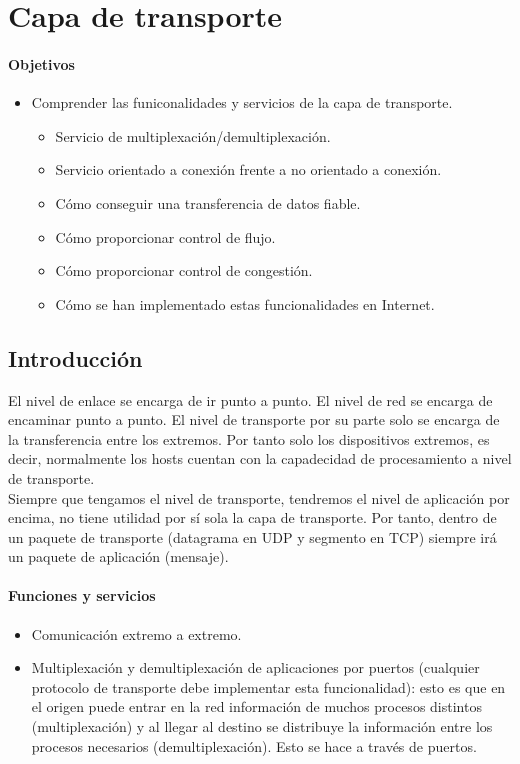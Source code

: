 \chapter{Capa de transporte}

\subsubsection{Objetivos}
\begin{itemize}
    \item Comprender las funiconalidades y servicios de la capa de transporte.
        \begin{itemize}
            \item Servicio de multiplexación/demultiplexación.
            \item Servicio orientado a conexión frente a no orientado a conexión.
            \item Cómo conseguir una transferencia de datos fiable.
            \item Cómo proporcionar control de flujo.
            \item Cómo proporcionar control de congestión.
            \item Cómo se han implementado estas funcionalidades en Internet.
        \end{itemize}
\end{itemize}

\section{Introducción}
El nivel de enlace se encarga de ir punto a punto. El nivel de red se encarga de encaminar punto a punto. El nivel de transporte por su parte solo se encarga de la transferencia entre los extremos. Por tanto solo los dispositivos extremos, es decir, normalmente los hosts cuentan con la capadecidad de procesamiento a nivel de transporte. \\

Siempre que tengamos el nivel de transporte, tendremos el nivel de aplicación por encima, no tiene utilidad por sí sola la capa de transporte. Por tanto, dentro de un paquete de transporte (datagrama en UDP y segmento en TCP) siempre irá un paquete de aplicación (mensaje).\\

\subsubsection{Funciones y servicios}
\begin{itemize}
    \item Comunicación extremo a extremo.
    \item Multiplexación y demultiplexación de aplicaciones por puertos (cualquier protocolo de transporte debe implementar esta funcionalidad): esto es que en el origen puede entrar en la red información de muchos procesos distintos (multiplexación) y al llegar al destino se distribuye la información entre los procesos necesarios (demultiplexación). Esto se hace a través de puertos. 
\end{itemize}

